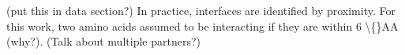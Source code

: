 (put this in data section?)
In practice, interfaces are identified by proximity. For this work, two amino acids assumed to be interacting if they are within 6 \textbackslash\{\}AA (why?). (Talk about multiple partners?)
